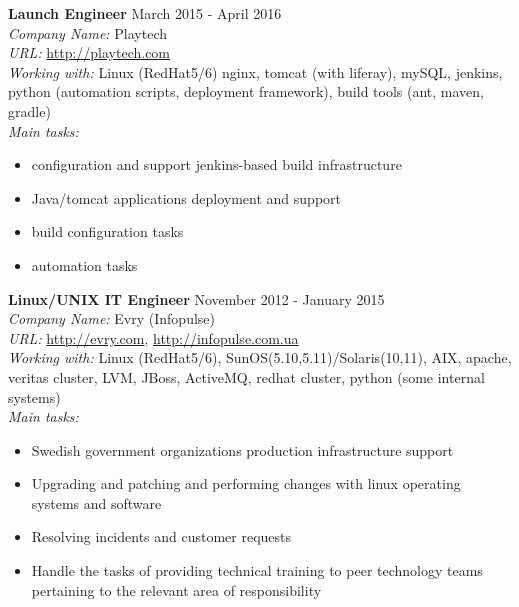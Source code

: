 \documentclass[mymargin,10pt]{res} %
\begin{document}
\begin{resume}
{\bf Launch Engineer} \hfill March 2015 - April 2016 \\
{\sl Company Name:} Playtech \\
{\sl URL:} \url{http://playtech.com} \\
{\sl Working with:} Linux (RedHat5/6) nginx, tomcat (with liferay), mySQL, jenkins, python (automation scripts, deployment framework), build tools (ant, maven, gradle) \\
{\sl Main tasks:}
\begin{itemize}
\item configuration and support jenkins-based build infrastructure
\item Java/tomcat applications deployment and support
\item build configuration tasks
\item automation tasks
\end{itemize}

{\bf Linux/UNIX IT Engineer} \hfill November 2012 - January 2015 \\
{\sl Company Name:} Evry (Infopulse) \\
{\sl URL:} \url{http://evry.com}, \url{http://infopulse.com.ua} \\
{\sl Working with:} Linux (RedHat5/6), SunOS(5.10,5.11)/Solaris(10,11), AIX, apache, veritas cluster, LVM,
JBoss, ActiveMQ, redhat cluster, python (some internal systems) \\
{\sl Main tasks:}
\begin{itemize}
\item Swedish government organizations production infrastructure support
\item Upgrading and patching and performing changes with linux operating systems and software
\item Resolving incidents and customer requests
\item Handle the tasks of providing technical training to peer technology teams pertaining to the
  relevant area of responsibility
\end{itemize}



\end{resume}
\end{document}
